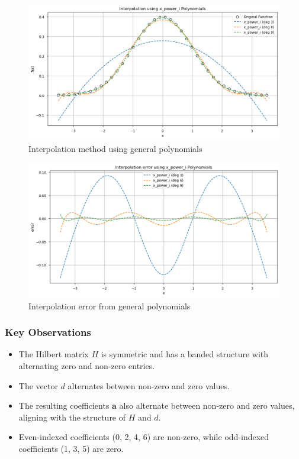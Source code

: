 \documentclass[10pt]{article}
\begin{document}
\begin{figure}[H]
    \centering
    \includegraphics[width=\imagewidth\textwidth]{figures/02_interpolation/interpolation_method_x_power_i.png}
    \caption{Interpolation method using general polynomials}
\end{figure}
\begin{figure}[H]
    \centering
    \includegraphics[width=\imagewidth\textwidth]{figures/02_interpolation/interpolation_error_method_x_power_i.png}
    \caption{Interpolation error from general polynomials}
\end{figure}

\subsubsection{Key Observations}
\begin{itemize}
    \item The Hilbert matrix \( H \) is symmetric and has a banded structure with alternating zero and non-zero entries.
    \item The vector \( d \) alternates between non-zero and zero values.
    \item The resulting coefficients \( \mathbf{a} \) also alternate between non-zero and zero values, aligning with the structure of \( H \) and \( d \).
    \item Even-indexed coefficients (0, 2, 4, 6) are non-zero, while odd-indexed coefficients (1, 3, 5) are zero.
\end{itemize}
\end{document}

